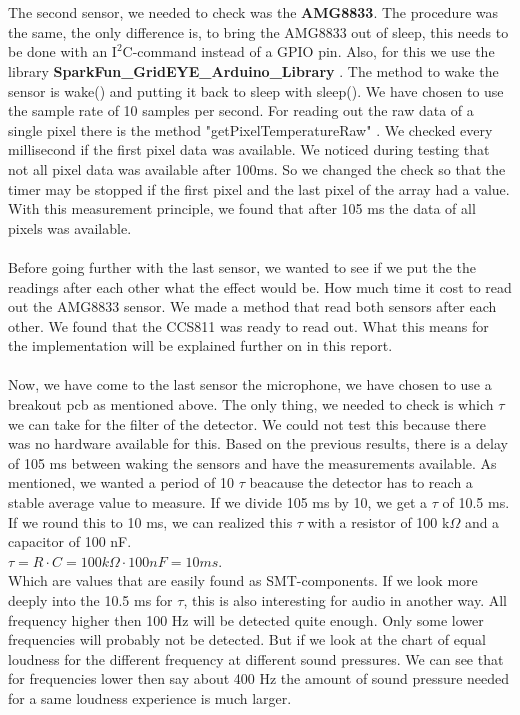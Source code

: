 \documentclass[11pt,a4paper]{article}
\begin{document}
\\ \\
 The second sensor, we needed to check was the \textbf{AMG8833}. The procedure was the same, the only difference is, to bring the AMG8833 out of sleep, this needs to be done with an $\text{I}^2$C-command instead of a GPIO pin. Also, for this we use the library \textbf{SparkFun\_GridEYE\_Arduino\_Library} \cite{lib_AMG8833} . The method to wake the sensor is wake() and putting it back to sleep with sleep(). We have chosen to use the sample rate of 10 samples per second. For reading out the raw data of a single pixel there is the method "getPixelTemperatureRaw" \cite{lib_AMG8833} . We checked every millisecond if the first pixel data was available. We noticed during testing that not all pixel data was available after 100ms. So we changed the check so that the timer may be stopped if the first pixel and the last pixel of the array had a value. With this measurement principle, we found that after 105 ms the data of all pixels was available.
\\ \\  
Before going further with the last sensor, we wanted to see if we put the the readings after each other what the effect would be. How much time it cost to read out the AMG8833 sensor. We made a method that read both sensors after each other. We found that the CCS811 was ready to read out. What this means for the implementation will be explained further on in this report. 
\\  \\ Now, we have come to the last sensor the microphone, we have chosen to use a breakout pcb as mentioned above. The only thing, we needed to check is which $\tau$ we can take for the filter of the detector. We could not test this because there was no hardware available for this. Based on the previous results, there is a delay of 105 ms between waking the sensors and have the measurements available. As mentioned, we wanted a period of 10 $\tau$ beacause the detector has to reach a stable average value to measure. If we divide 105 ms  by 10, we get  a $\tau$ of 10.5 ms. If we round this to 10 ms, we can realized this $\tau$ with a resistor of 100 k$\Omega$ and a capacitor of 100 nF.\\
$\tau= R \cdot C =  100 k\Omega \cdot 100 nF= 10 ms$.\\
Which are values that are easily found as SMT-components. If we look more deeply into the 10.5 ms for $\tau$, this is also interesting for audio in another way. All frequency higher then 100 Hz will be detected quite enough. Only some lower frequencies will probably not be detected. But if we look at the chart of equal loudness for the different frequency at different sound pressures. We can see that for frequencies lower then say about 400 Hz the amount of sound pressure needed for a same loudness experience is much larger. 
\end{document}
